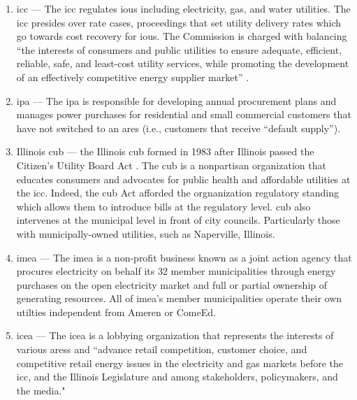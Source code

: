 \begin{enumerate}
    \item \acf{icc} --- The \ac{icc} regulates \acp{iou} including electricity,
    gas, and water utilities. The \ac{icc} presides over rate cases, proceedings
    that set utility delivery rates which go towards cost recovery for
    \acp{iou}. The Commission is charged with balancing ``the interests of
    consumers and public utilities to ensure adequate, efficient, reliable,
    safe, and least-cost utility services, while promoting the development of an
    effectively competitive energy supplier market''
    \cite{illinois_commerce_commision_icc_citizens_2022}.
    \item \acf{ipa} --- The \ac{ipa} is responsible for developing annual
    procurement plans and manages power purchases for residential and small
    commercial customers that have not switched to an \ac{ares} (i.e., customers
    that receive ``default supply'').
    \item Illinois \acf{cub} --- the Illinois \ac{cub} formed in 1983 after
    Illinois passed the Citizen's Utility Board Act
    \cite{illinois_83rd_general_assembly_citizens_1983}. The \ac{cub} is a
    nonpartisan organization that educates consumers and advocates for public
    health and affordable utilities at the \ac{icc}. Indeed, the \ac{cub} Act
    afforded the orgnanization regulatory standing which allows them to
    introduce bills at the regulatory level. \ac{cub} also intervenes at the
    municipal level in front of city councils. Particularly those with
    municipally-owned utilities, such as Naperville, Illinois.
    \item \acf{imea} --- The \ac{imea} is a non-profit business known as a joint
    action agency that procures electricity on behalf its 32 member
    municipalities through energy purchases on the open electricity market and
    full or partial ownership of generating resources. All of \ac{imea}'s member
    municipalities operate their own utilties independent from Ameren or ComeEd.
    \item \acf{icea} --- The \ac{icea} is a lobbying organization that
    represents the interests of various \acp{ares} and ``advance retail
    competition, customer choice, and competitive retail energy issues in the
    electricity and gas markets before the \ac{icc}, and the Illinois
    Legislature and among stakeholders, policymakers, and the media."
\end{enumerate}

